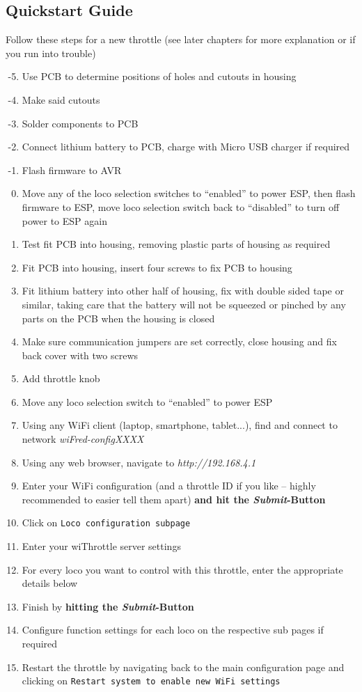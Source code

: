 \documentclass[11pt,a4paper]{scrartcl}
\begin{document}
\subsection{Quickstart Guide}

Follow these steps for a new throttle (see later chapters for more explanation or if you run into trouble)

\begin{enumerate}
\setcounter{enumi}{-6}
\item Use PCB to determine positions of holes and cutouts in housing
\item Make said cutouts
\item Solder components to PCB
\item Connect lithium battery to PCB, charge with Micro USB charger if required
\item Flash firmware to AVR
\item Move any of the loco selection switches to ``enabled'' to power ESP, then flash firmware to ESP, move loco selection switch back to ``disabled'' to turn off power to ESP again
\item Test fit PCB into housing, removing plastic parts of housing as required
\item Fit PCB into housing, insert four screws to fix PCB to housing
\item Fit lithium battery into other half of housing, fix with double sided tape or similar, taking care that the battery will not be squeezed or pinched by any parts on the PCB when the housing is closed
\item Make sure communication jumpers are set correctly, close housing and fix back cover with two screws
\item Add throttle knob
\item Move any loco selection switch to ``enabled'' to power ESP
\item Using any WiFi client (laptop, smartphone, tablet...), find and connect to network \textit{wiFred-configXXXX}
\item Using any web browser, navigate to \textit{http://192.168.4.1}
\item Enter your WiFi configuration (and a throttle ID if you like -- highly recommended to easier tell them apart) \textbf{and hit the \textit{Submit}-Button}
\item Click on \texttt{Loco configuration subpage}
\item Enter your wiThrottle server settings
\item For every loco you want to control with this throttle, enter the appropriate details below
\item Finish by \textbf{hitting the \textit{Submit}-Button}
\item Configure function settings for each loco on the respective sub pages if required
\item Restart the throttle by navigating back to the main configuration page and clicking on \texttt{Restart system to enable new WiFi settings}
\end{enumerate}
\end{document}
